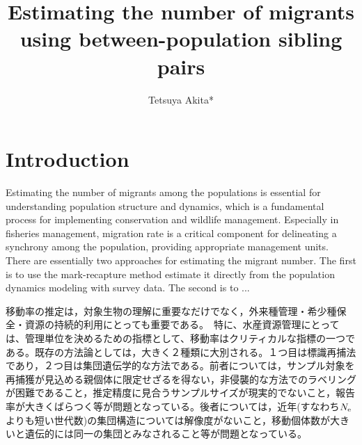 \documentclass[AMA,STIX1COL]{WileyNJD-v2}
\begin{document}
\title{Estimating the number of migrants using between-population sibling pairs}%

\author[1]{Tetsuya Akita*}



\address[1]{, , }





\maketitle



\section{Introduction}\label{sec1}

Estimating the number of migrants among the populations is essential for understanding population structure and dynamics, which is a fundamental process for implementing conservation and wildlife management. Especially in fisheries management, migration rate is a critical component for delineating a synchrony among the population, providing appropriate management units. There are essentially two approaches for estimating the migrant number. The first is to use the mark-recapture method estimate it directly from the population dynamics modeling with survey data. The second is to ...

移動率の推定は，対象生物の理解に重要なだけでなく，外来種管理・希少種保全・資源の持続的利用にとっても重要である。　特に、水産資源管理にとっては、管理単位を決めるための指標として、移動率はクリティカルな指標の一つである。既存の方法論としては，大きく２種類に大別される。１つ目は標識再捕法であり，２つ目は集団遺伝学的な方法である。前者については，サンプル対象を再捕獲が見込める親個体に限定せざるを得ない，非侵襲的な方法でのラベリングが困難であること，推定精度に見合うサンプルサイズが現実的でないこと，報告率が大きくばらつく等が問題となっている。後者については，近年(すなわち$N_{\rm e}$よりも短い世代数)の集団構造については解像度がないこと，移動個体数が大きいと遺伝的には同一の集団とみなされること等が問題となっている。
\end{document}
